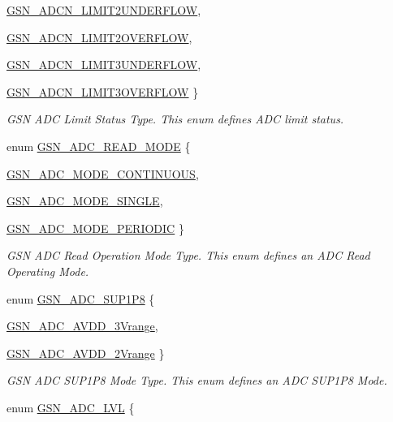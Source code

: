 \begin{DoxyCompactItemize}
\par
\hyperlink{a00643_gga008458c1074bf0e3aace6adfc8a9a7d7ae3a69ffc7ed81e40e16dfbeaf19d6592}{GSN\_\-ADCN\_\-LIMIT2UNDERFLOW}, 
\par
\hyperlink{a00643_gga008458c1074bf0e3aace6adfc8a9a7d7a91ae8ee73c44297fccb90a87179e0cb5}{GSN\_\-ADCN\_\-LIMIT2OVERFLOW}, 
\par
\hyperlink{a00643_gga008458c1074bf0e3aace6adfc8a9a7d7abb7b627990963a89988d038df6e5312e}{GSN\_\-ADCN\_\-LIMIT3UNDERFLOW}, 
\par
\hyperlink{a00643_gga008458c1074bf0e3aace6adfc8a9a7d7a3af86d6a8baa35510a3d4a1775d11fac}{GSN\_\-ADCN\_\-LIMIT3OVERFLOW}
 \}
\begin{DoxyCompactList}\small\item\em GSN ADC Limit Status Type. This enum defines ADC limit status. \end{DoxyCompactList}\item 
enum \hyperlink{a00643_ga99061f6e0169c89e57e4cd5d5ce1596c}{GSN\_\-ADC\_\-READ\_\-MODE} \{ \par
\hyperlink{a00643_gga99061f6e0169c89e57e4cd5d5ce1596ca71c38b7f173fdbaa4614d5acfc5b0042}{GSN\_\-ADC\_\-MODE\_\-CONTINUOUS}, 
\par
\hyperlink{a00643_gga99061f6e0169c89e57e4cd5d5ce1596ca6901743892c2226928dd4cd0d1a166cf}{GSN\_\-ADC\_\-MODE\_\-SINGLE}, 
\par
\hyperlink{a00643_gga99061f6e0169c89e57e4cd5d5ce1596ca3a8232d0d78017fdf697c629c66098a6}{GSN\_\-ADC\_\-MODE\_\-PERIODIC}
 \}
\begin{DoxyCompactList}\small\item\em GSN ADC Read Operation Mode Type. This enum defines an ADC Read Operating Mode. \end{DoxyCompactList}\item 
enum \hyperlink{a00643_gadc3afaf6a966c7c6199e4d8f37da8b73}{GSN\_\-ADC\_\-SUP1P8} \{ \par
\hyperlink{a00643_ggadc3afaf6a966c7c6199e4d8f37da8b73a373a83a479cc10783a719934a63cd5a4}{GSN\_\-ADC\_\-AVDD\_\-3Vrange}, 
\par
\hyperlink{a00643_ggadc3afaf6a966c7c6199e4d8f37da8b73a780aa6f8661d3d07f2a1d2368c377673}{GSN\_\-ADC\_\-AVDD\_\-2Vrange}
 \}
\begin{DoxyCompactList}\small\item\em GSN ADC SUP1P8 Mode Type. This enum defines an ADC SUP1P8 Mode. \end{DoxyCompactList}\item 
enum \hyperlink{a00643_ga3309e4e970c6632c63ec80fb739e7c0e}{GSN\_\-ADC\_\-LVL} \{ \par

\end{DoxyCompactItemize}
